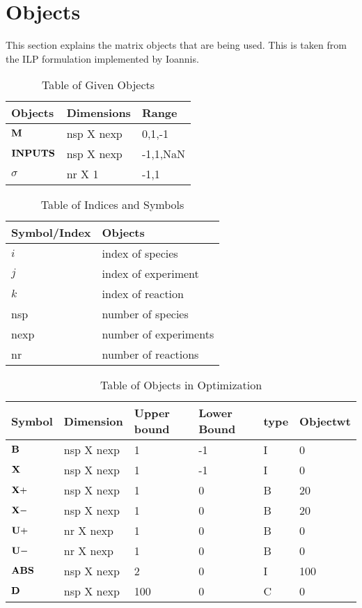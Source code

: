 \documentclass[
10pt, %
letter, %
oneside, %
BCOR02mm, %
]{scrartcl}
\begin{document}
\section{Objects}
This section explains the matrix objects that are being used. This is taken from the ILP formulation implemented by Ioannis.
\begin{table}
\caption{Table of Given Objects}
\label{ob_giv}
\centering
\begin{tabular}{lll}
\hline
Objects& Dimensions &  Range \\
\hline
$\bf{M}$& nsp X nexp &  0,1,-1 \\
$\bf{INPUTS}$& nsp X nexp &  -1,1,NaN\\
$\sigma$& nr X 1  & -1,1\\
\hline
\end{tabular}
\end{table}
\begin{table}
\caption{Table of Indices and Symbols}
\label{ob_sym}
\centering
\begin{tabular}{ll}
\hline
Symbol/Index& Objects \\
\hline
$i$& index of species  \\
$j$& index of experiment\\
$k$& index of reaction\\
nsp& number of species  \\
nexp& number of experiments\\
nr& number of reactions\\
\hline
\end{tabular}
\end{table}
\begin{table}
\caption{Table of Objects in Optimization}
\label{ob_opt}
\begin{tabular}{llllll}
\hline
Symbol& Dimension& Upper bound& Lower Bound & type & Objectwt\\
\hline
$\bf{B}$ & nsp X nexp & 1 & -1 & I & 0 \\
$\bf{X}$ & nsp X nexp & 1 & -1 & I & 0 \\
$\bf{X+}$& nsp X nexp & 1 & 0 & B & 20 \\
$\bf{X-}$& nsp X nexp & 1 & 0 & B & 20 \\
$\bf{U+}$& nr X nexp & 1 & 0 & B & 0 \\
$\bf{U-}$& nr X nexp & 1 & 0 & B & 0 \\
$\bf{ABS}$& nsp X nexp & 2 & 0 & I & 100 \\
$\bf{D}$& nsp X nexp & 100 & 0 & C & 0 \\
\hline
\end{tabular}
\end{table}
\end{document}
